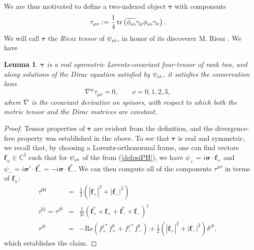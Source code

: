 \documentclass[12pt]{article}
\newtheorem{lem}[thm]{Lemma}
\theoremstyle{definition}
\DeclareMathOperator{\tr}{tr}
\newcommand{\refeq}[1]{(\ref{#1})}
\numberwithin{equation}{section}
\newcommand{\beff}{\mathbf{f}}
\newcommand{\btau}{\boldsymbol{\tau}}
\newcommand{\beq}{\begin{equation}}
\newcommand{\eeq}{\end{equation}}
\newcommand{\siV}{\boldsymbol{\sigma}}
\newcommand{\psiPH}{{\psi_{\mbox{\rm\tiny ph}}}}
\newcommand{\phiPH}{{\phi_{\mbox{\rm\tiny ph}}}}
\newcommand{\Cset}{{\mathbb C}}
\newcommand{\de}{\delta}
\newcommand{\ga}{\gamma}
\newcommand{\half}{\frac{1}{2}}
\newcommand{\bna}{\begin{eqnarray}}
\newcommand{\ena}{\end{eqnarray}}
\begin{document}
 We are thus motivated to define a two-indexed object $\boldsymbol{\tau}$ with components
\beq \label{def:tau}
\tau_{\mu\nu} := \frac{1}{4}\tr\left( \overline{\phiPH} \ga_\mu \phiPH \ga_\nu \right).
\eeq
 We will call $\btau$ the {\em Riesz tensor} of $\psiPH$, in honor of its discoverer M. Riesz \cite{Rie1946}.  
 We have
%
\begin{lem}
$\boldsymbol{\tau}$ is a real symmetric Lorentz-covariant four-tensor of rank two, and along solutions of the Dirac equation satisfied by $\psiPH$, 
it satisfies the conservation laws
\beq \label{taudivfree}
\nabla^\mu \tau_{\mu\nu} = 0,\qquad \nu = 0,1,2,3,
\eeq
where $\nabla$ is the covariant derivative on spinors, with respect to which both the metric tensor and the Dirac matrices are constant. 
\end{lem}
%
\begin{proof}
Tensor properties of $\boldsymbol{\tau}$ are evident from the definition, and the divergence-free property was established in the above. 
 To see that $\boldsymbol{\tau}$ is real and symmetric, we recall that, by choosing a Lorentz-orthonormal frame, one can find vectors 
$\beff_\pm \in \Cset^3$ such that for $\psiPH$ of the from \refeq{defpsiPH}, we have $\psi_+ = i\siV\cdot\beff_+$ and
 $\psi_- =i \siV'\cdot\beff_-^\ast = - i\siV\cdot\beff_-^\ast$. 
 We can then compute all of the components $\tau^{\mu\nu}$ in terms of $\beff_\pm$:
\bna \label{tau00}
\tau^{00} & = & \half\left( |\beff_+|^2 + |\beff_-|^2 \right) \\ \label{tau0j}
\tau^{0j} = \tau^{j0} & = & \frac{1}{2i} \left( \beff_+^\ast \times \beff_+ + \beff_-^\ast \times \beff_- \right)^j \\ \label{taujk}
\tau^{jk} & = & -\mbox{Re} \left( f_+^{j\ast} f_+^k + f_-^{j\ast}f_-^k\right)  + \half (|\beff_+|^2+|\beff_-|^2) \de^{jk},
\ena
which establishes the claim. 
\end{proof}
%
\end{document}
